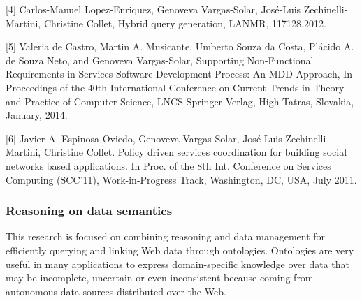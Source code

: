 \begin{description}

[4] Carlos-Manuel Lopez-Enriquez, Genoveva Vargas-Solar, Jos{\'e}-Luis Zechinelli-Martini, Christine Collet, Hybrid query generation,  LANMR,  117128,2012.

[5] Valeria de Castro, Martin A. Musicante, Umberto Souza da Costa, Pl{\'a}cido A. de Souza Neto, and Genoveva Vargas-Solar, Supporting Non-Functional Requirements in Services Software Development Process: An MDD Approach, In Proceedings of the 40th International Conference on Current Trends in Theory and Practice of Computer Science,  LNCS Springer Verlag, High Tatras, Slovakia, January, 2014. 

[6] Javier A. Espinosa-Oviedo, Genoveva Vargas-Solar, Jos{\'e}-Luis Zechinelli-Martini, Christine Collet. Policy driven services coordination for building social networks based applications. In Proc. of the 8th Int. Conference on Services Computing (SCC'11), Work-in-Progress Track, Washington, DC, USA, July 2011.

\end{description}

\subsubsection{Reasoning on data semantics}

This research is focused on combining reasoning and data management for efficiently querying and linking Web data through ontologies. Ontologies are very useful in many applications to express domain-specific knowledge over data that may be incomplete, uncertain or even inconsistent because coming from autonomous data sources distributed over the Web. 

